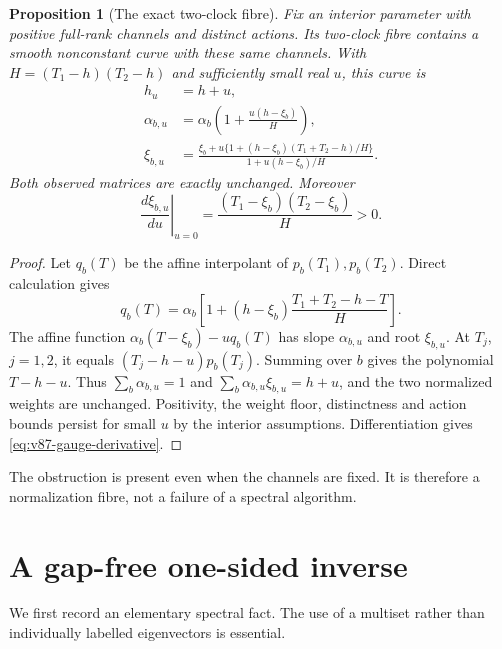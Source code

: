 \documentclass[11pt,reqno]{amsart}
\numberwithin{equation}{section}
\newtheorem{proposition}[theorem]{Proposition}
\theoremstyle{definition}\newtheorem{definition}[theorem]{Definition}
\theoremstyle{remark}\newtheorem{remark}[theorem]{Remark}
\begin{document}
\begin{proposition}[The exact two-clock fibre]\label{prop:v87-fibre}
Fix an interior parameter with positive full-rank channels and distinct
actions. Its two-clock fibre contains a smooth nonconstant curve with
these same channels. With $H=(T_1-h)(T_2-h)$ and sufficiently small
real $u$, this curve is
\begin{align}
 h_u&=h+u,\nonumber\\
 \alpha_{b,u}&=\alpha_b\left(1+\frac{u(h-\xi_b)}{H}\right),
                                                        \label{eq:v87-gauge}\\
 \xi_{b,u}&=\frac{\xi_b+u\{1+(h-\xi_b)(T_1+T_2-h)/H\}}
                  {1+u(h-\xi_b)/H}.\nonumber
\end{align}
Both observed matrices are exactly unchanged. Moreover
\begin{equation}\label{eq:v87-gauge-derivative}
 \left.\frac{d\xi_{b,u}}{du}\right|_{u=0}
                =\frac{(T_1-\xi_b)(T_2-\xi_b)}{H}>0.
\end{equation}
\end{proposition}
\begin{proof}
Let $q_b(T)$ be the affine interpolant of $p_b(T_1),p_b(T_2)$.
Direct calculation gives
\begin{equation}\label{eq:v87-q}
 q_b(T)=\alpha_b\left[1+(h-\xi_b)
                           \frac{T_1+T_2-h-T}{H}\right].
\end{equation}
The affine function
$\alpha_b(T-\xi_b)-u q_b(T)$ has slope $\alpha_{b,u}$ and root
$\xi_{b,u}$. At $T_j$, $j=1,2$, it equals
$(T_j-h-u)p_b(T_j)$. Summing over $b$ gives the polynomial
$T-h-u$. Thus $\sum_b\alpha_{b,u}=1$ and
$\sum_b\alpha_{b,u}\xi_{b,u}=h+u$, and the two normalized weights
are unchanged. Positivity, the weight floor, distinctness and action
bounds persist for small $u$ by the interior assumptions.
Differentiation gives \eqref{eq:v87-gauge-derivative}.
\end{proof}
The obstruction is present even when the channels are fixed. It is
therefore a normalization fibre, not a failure of a spectral algorithm.

\section{A gap-free one-sided inverse}
\label{sec:v87-inverse}
We first record an elementary spectral fact. The use of a multiset
rather than individually labelled eigenvectors is essential.
\end{document}
